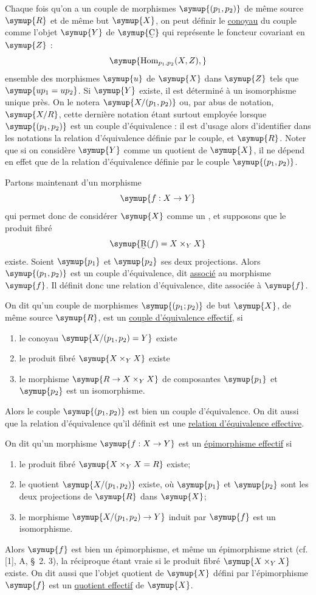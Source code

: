Chaque fois qu'on a un couple de morphismes $\symup{(p_1,p_2)}$ de même source $\symup{R}$ et
de même but $\symup{X}$, on peut définir le \uline{conoyau} du couple comme l'objet $\symup{Y}$
de $\symup{\text{\uwave{C}}}$ qui représente le foncteur covariant en $\symup{Z}$ :
\[
  \symup{\operatorname{Hom}_{p_1,p_2}(X,Z),}
\]
ensemble des morphismes $\symup{u}$ de $\symup{X}$ dans $\symup{Z}$ tels que $\symup{up_1=up_2}$. Si $\symup{Y}$
existe, il est déterminé à un isomorphisme unique près. On le notera
$\symup{X/(p_1,p_2)}$ ou, par abus de notation, $\symup{X/R}$, cette dernière notation étant
surtout employée lorsque
$\symup{(p_1,p_2)}$ est un couple d'équivalence : il est d'usage alors
d'identifier dans les notations la relation d'équivalence définie par le
couple, et $\symup{R}$. Noter que si on considère $\symup{Y}$ comme un quotient de $\symup{X}$, il ne
dépend en effet que de la relation d'équivalence définie par le couple
$\symup{(p_1,p_2)}$.

Partons maintenant d'un morphisme
\[
  \symup{f:X\to Y}
\]
qui permet donc de considérer $\symup{X}$ comme un , et
supposons que le produit fibré
\[
  \symup{\text{\uwave{R}}(f)=X\times_Y X}
\]
existe. Soient $\symup{p_1}$ et $\symup{p_2}$ ses deux projections. Alors $\symup{(p_1,p_2)}$ est un
couple d'équivalence, dit \uline{associé} au morphisme $\symup{f}$. Il définit donc une
relation d'équivalence, dite associée à $\symup{f}$.

On dit qu'un couple de morphismes $\symup{(p_1;p_2)}$ de but $\symup{X}$, de même source $\symup{R}$,
est un \uline{couple d'équivalence effectif}, si
\begin{enumerate}
  \item[(i)] le conoyau $\symup{X/(p_1,p_2)=Y}$ existe
  \item[(ii)] le produit fibré $\symup{X\times_Y X}$ existe
  \item[(iii)] le morphisme $\symup{R\to X\times_Y X}$ de composantes $\symup{p_1}$ et
  $\symup{p_2}$ est un isomorphisme.
\end{enumerate}
Alors le couple $\symup{(p_1,p_2)}$ est bien un couple d'équivalence. On dit aussi que
la relation d'équivalence qu'il définit est une \uline{relation d'équivalence
effective}.

On dit qu'un morphisme $\symup{f:X\to Y}$ est un \uline{épimorphisme
effectif} si
\begin{enumerate}
  \item[(i)] le produit fibré $\symup{X\times_Y X=R}$ existe;
  \item[(ii)] le quotient $\symup{X/(p_1,p_2)}$ existe, où $\symup{p_1}$ et $\symup{p_2}$ sont les deux
  projections de $\symup{R}$ dans $\symup{X}$;
  \item[(iii)] le morphisme $\symup{X/(p_1,p_2)\to Y}$ induit par $\symup{f}$ est un
  isomorphisme.
\end{enumerate}
Alors $\symup{f}$ est bien un épimorphisme, et même un épimorphisme strict (cf. [1],
A, \S~2. 3), la réciproque étant vraie si le produit fibré $\symup{X\times_Y X}$
existe. On dit aussi que l'objet quotient de $\symup{X}$ défini par l'épimorphisme $\symup{f}$
est un \uline{quotient effectif} de $\symup{X}$.

